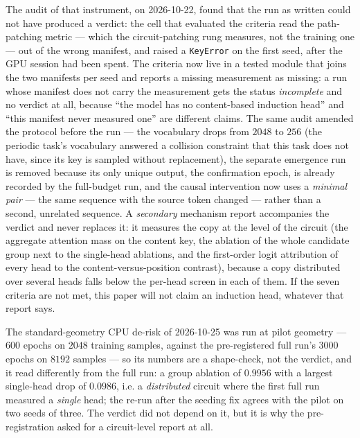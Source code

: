 \documentclass[11pt]{article}
\begin{document}
The audit of that instrument, on 2026-10-22, found that the run as written
could not have produced a verdict: the cell that evaluated the criteria read
the path-patching metric --- which the circuit-patching rung measures, not
the training one --- out of the wrong manifest, and raised a \texttt{KeyError}
on the first seed, after the GPU session had been spent. The criteria now
live in a tested module that joins the two manifests per seed and reports a
missing measurement as missing: a run whose manifest does not carry the
measurement gets the status \emph{incomplete} and no verdict at all, because
``the model has no content-based induction head'' and ``this manifest never
measured one'' are different claims. The same audit amended the protocol
before the run --- the vocabulary drops from $2048$ to $256$ (the periodic
task's vocabulary answered a collision constraint that this task does not
have, since its key is sampled without replacement), the separate emergence
run is removed because its only unique output, the confirmation epoch, is
already recorded by the full-budget run, and the causal intervention now uses a
\emph{minimal pair} --- the same sequence with the source token changed ---
rather than a second, unrelated sequence. A \emph{secondary} mechanism report
accompanies the verdict and never replaces it: it measures the copy at the
level of the circuit (the aggregate attention mass on the content key, the
ablation of the whole candidate group next to the single-head ablations, and
the first-order logit attribution of every head to the content-versus-position
contrast), because a copy distributed over several heads falls below the
per-head screen in each of them. If the seven criteria are not met, this
paper will not claim an induction head, whatever that report says.

The standard-geometry CPU de-risk of 2026-10-25 was run at pilot geometry ---
$600$ epochs on $2048$ training samples, against the pre-registered full
run's $3000$ epochs on $8192$ samples --- so its numbers are a shape-check, not
the verdict, and it read differently from the full run: a group ablation of
$0.9956$ with a largest single-head drop of $0.0986$, i.e. a \emph{distributed}
circuit where the first full run measured a \emph{single} head; the re-run after the seeding fix agrees with
the pilot on two seeds of three. The verdict did not
depend on it, but it is why the pre-registration asked for a circuit-level
report at all.
\end{document}
